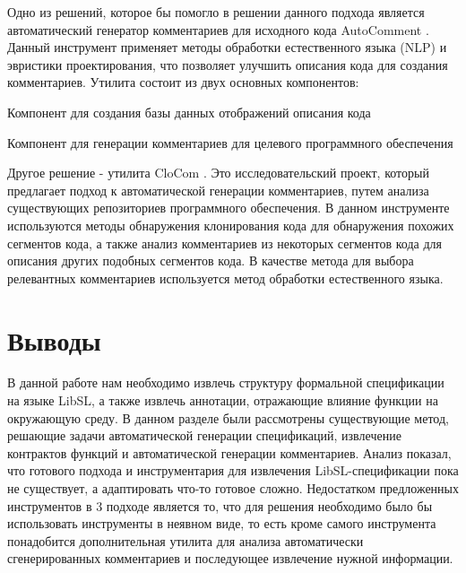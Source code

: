 Одно из решений, которое бы помогло в решении данного подхода является автоматический генератор комментариев для исходного кода AutoComment \cite{AutoComment}.
Данный инструмент применяет методы обработки естественного языка (NLP) и эвристики проектирования, что позволяет улучшить описания кода для создания комментариев.
Утилита состоит из двух основных компонентов:
%
\begin{itemize*}
\item Компонент для создания базы данных отображений описания кода
\item Компонент для генерации комментариев для целевого программного обеспечения
\end{itemize*}
%

Другое решение - утилита CloCom \cite{CloCom}. Это исследовательский проект, который предлагает подход к автоматической генерации комментариев, путем анализа существующих репозиториев программного обеспечения.
В данном инструменте используются методы обнаружения клонирования кода для обнаружения похожих сегментов кода, а также анализ комментариев из некоторых сегментов кода для описания других подобных сегментов кода.
В качестве метода для выбора релевантных комментариев используется метод обработки естественного языка.


\section{Выводы}

В данной работе нам необходимо извлечь структуру формальной спецификации на языке LibSL, а также извлечь аннотации, отражающие влияние функции на окружающую среду.
В данном разделе были рассмотрены существующие метод, решающие задачи автоматической генерации спецификаций, извлечение контрактов функций и автоматической генерации комментариев.
Анализ показал, что готового подхода и инструментария для извлечения LibSL-спецификации пока не существует, а адаптировать что-то готовое сложно.
Недостатком предложенных инструментов в 3 подходе является то, что для решения необходимо было бы использовать инструменты в неявном виде, то есть кроме самого инструмента понадобится дополнительная утилита для анализа автоматически сгенерированных комментариев и последующее извлечение нужной информации.
